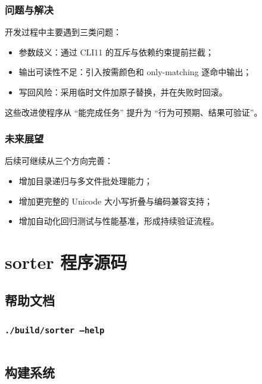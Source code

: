 \documentclass[12pt, a4paper]{ctexart}
\begin{document}
\subsubsection{问题与解决}

开发过程中主要遇到三类问题：

\begin{itemize}
    \item 参数歧义：通过 CLI11 的互斥与依赖约束提前拦截；
    \item 输出可读性不足：引入按需颜色和 only-matching 逐命中输出；
    \item 写回风险：采用临时文件加原子替换，并在失败时回滚。
\end{itemize}

这些改进使程序从 ``能完成任务'' 提升为 ``行为可预期、结果可验证''。

\subsubsection{未来展望}

后续可继续从三个方向完善：

\begin{itemize}
    \item 增加目录递归与多文件批处理能力；
    \item 增加更完整的 Unicode 大小写折叠与编码兼容支持；
    \item 增加自动化回归测试与性能基准，形成持续验证流程。
\end{itemize}

\appendix

\section{sorter 程序源码}

\subsection{帮助文档}

\subsubsection{\texttt{./build/sorter --help}}
\inputminted{text}{../sorter/res/help.txt}

\subsection{构建系统}
\end{document}
